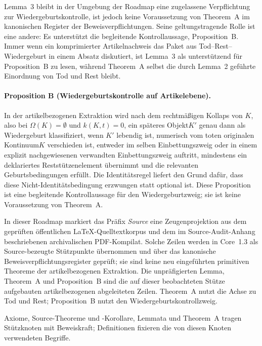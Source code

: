 Lemma~3 bleibt in der Umgebung der Roadmap eine zugelassene Verpflichtung zur Wiedergeburtskontrolle,
ist jedoch keine Voraussetzung von Theorem~A im kanonischen Register der Beweisverpflichtungen. Seine
geltungstragende Rolle ist eine andere: Es unterstützt die begleitende Kontrollaussage,
Proposition~B. Immer wenn ein komprimierter Artikelnachweis das Paket aus Tod--Rest--Wiedergeburt
in einem Absatz diskutiert, ist Lemma~3 als unterstützend für Proposition~B zu lesen, während
Theorem~A selbst die durch Lemma~2 geführte Einordnung von Tod und Rest bleibt.

\paragraph{Proposition B (Wiedergeburtskontrolle auf Artikelebene).}
\label{prop:oc13-rebirth-control}
In der artikelbezogenen Extraktion wird nach dem rechtmäßigen Kollaps von
\(K\), also bei \(\Omega(K)=\emptyset\) und \(k(K,t)=0\), ein späteres Objekt\(K'\) genau dann
als Wiedergeburt klassifiziert, wenn \(K'\) lebendig ist, numerisch vom toten originalen Kontinuum\(K\)
verschieden ist, entweder im selben Einbettungszweig oder in einem explizit nachgewiesenen verwandten
Einbettungszweig auftritt, mindestens ein deklariertes Reststützenelement übernimmt und die relevanten
Geburtsbedingungen erfüllt. Die Identitätsregel liefert den Grund dafür, dass diese Nicht-Identitätsbedingung
erzwungen statt optional ist. Diese Proposition ist eine begleitende Kontrollaussage für den Wiedergeburtzweig;
sie ist keine Voraussetzung von Theorem~A.

In dieser Roadmap markiert das Präfix \emph{Source} eine Zeugenprojektion aus dem geprüften öffentlichen
LaTeX-Quelltextkorpus und dem im Source-Audit-Anhang beschriebenen archivalischen PDF-Kompilat.
Solche Zeilen werden in Core~1.3 als Source-bezeugte Stützpunkte übernommen und über das
kanonische Beweisverpflichtungsregister geprüft; sie sind keine neu eingeführten primitiven Theoreme der
artikelbezogenen Extraktion. Die unpräfigierten Lemma, Theorem~A und Proposition~B sind die auf dieser
beobachteten Stütze aufgebauten artikelbezogenen abgeleiteten Zeilen. Theorem~A nutzt die Achse zu
Tod und Rest; Proposition~B nutzt den Wiedergeburtskontrollzweig.

Axiome, Source-Theoreme und -Korollare, Lemmata und Theorem~A tragen Stützknoten mit
Beweiskraft; Definitionen fixieren die von diesen Knoten verwendeten Begriffe.

